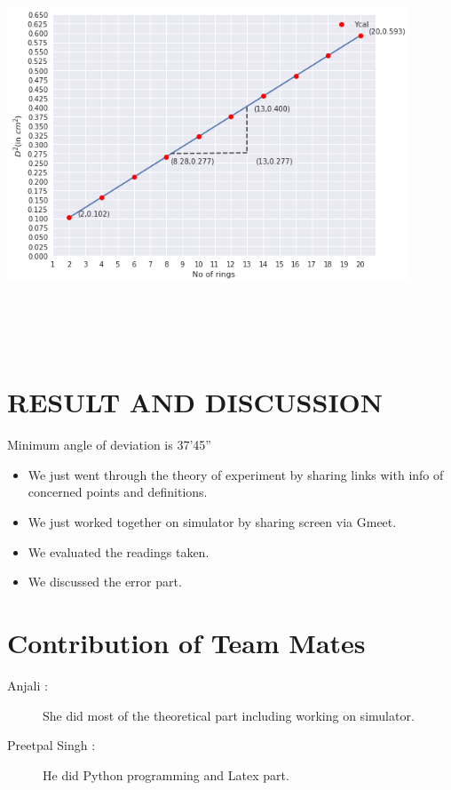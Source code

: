 \documentclass{article}
\begin{document}
\includegraphics[width = 12cm, height = 12cm]{Figure.png}




\section{RESULT AND DISCUSSION}
{\Large ️Minimum angle of deviation is 37'45''}
\begin{itemize}
    \item We just went through the theory of experiment by sharing links with info of concerned points and definitions.
    \item We just worked together on simulator by sharing screen via Gmeet.
    \item We evaluated the readings taken.
    \item We discussed the error part.
\end{itemize}

\section{Contribution of Team Mates}
\begin{description}
		\item[Anjali : ] She did most of the theoretical part including working on simulator.
		\item[Preetpal Singh : ] He did Python programming and Latex part. 
	\end{description}
	
\end{document}
